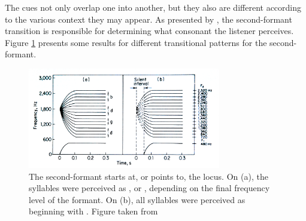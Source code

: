 The cues not only overlap one into another, but they also are different according to the various context they may appear. As presented by \cite{liberman1967}, the second-formant transition is responsible for determining what consonant the listener perceives. Figure \ref{fig:liberman2} presents some results for different transitional patterns for the second-formant.

\begin{figure}[h!]
\centering
\includegraphics[width=0.75\textwidth]{images/liberman2.png}
\caption{The second-formant starts at, or points to, the  locus. On (a), the syllables were perceived as ,  or , depending on the final frequency level of the formant. On (b), all syllables were perceived as beginning with . Figure taken from \cite{dalattre1955}}
\label{fig:liberman2}
\end{figure} 
